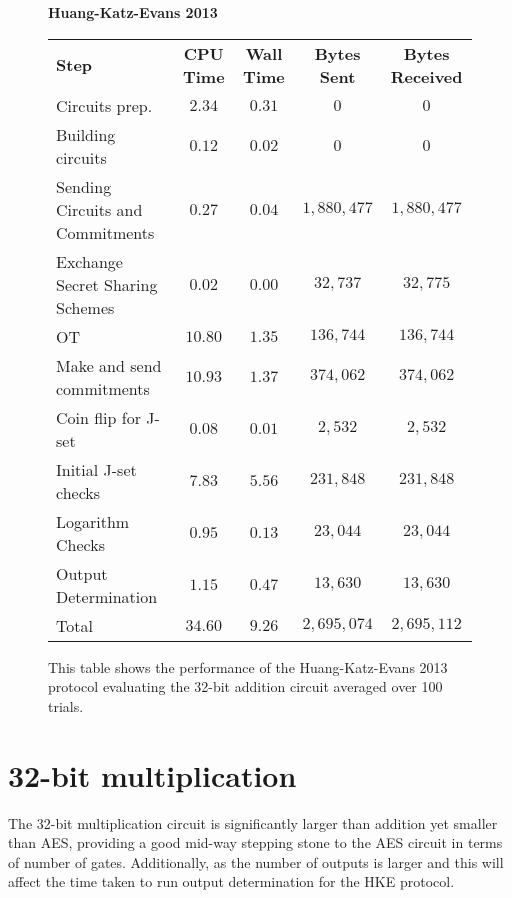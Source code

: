 \documentclass[ %
                    author={Nicholas Tutte},
                supervisor={Prof. Nigel Smart},
                    degree={MEng},
                     title={Secure Two Party Computation},
                  subtitle={A practical comparison of recent protocols},
                      type={Research - GG1K},
                      year={2015} ]{dissertation}
\begin{document}
				\begin{figure}[!ht]
						\textbf{Huang-Katz-Evans 2013}\\
						\begin{tabular}{| p{3.5cm} | c c c c |}
							\hline
							\textbf{Step} & \textbf{CPU Time} & \textbf{Wall Time} & \textbf{Bytes Sent} & \textbf{Bytes Received} \\
							\thickhline
							Circuits prep. & $2.34$ & $0.31$ & $0$ & $0$ \\
							\hline
							Building circuits & $0.12$ & $0.02$ & $0$ & $0$ \\
							\hline
							Sending Circuits and Commitments & $0.27$ & $0.04$ & $1,880,477$ & $1,880,477$ \\
							\hline
							Exchange Secret Sharing Schemes & $0.02$ & $0.00$ & $32,737$ & $32,775$ \\
							\hline
							OT & $10.80$ & $1.35$ & $136,744$ & $136,744$ \\
							\hline
							Make and send commitments & $10.93$ & $1.37$ & $374,062$ & $374,062$ \\
							\hline
							Coin flip for J-set & $0.08$ & $0.01$ & $2,532$ & $2,532$ \\
							\hline
							Initial J-set checks & $7.83$ & $5.56$ & $231,848$ & $231,848$ \\
							\hline
							Logarithm Checks & $0.95$ & $0.13$ & $23,044$ & $23,044$ \\
							\hline
							Output Determination & $1.15$ & $0.47$ & $13,630$ & $13,630$ \\
							\thickhline
							Total & $34.60$ & $9.26$ & $2,695,074$ & $2,695,112$ \\
							\hline
						\end{tabular}
					\caption{This table shows the performance of the Huang-Katz-Evans 2013 protocol evaluating the 32-bit addition circuit averaged over 100 trials.\label{table:HKE_2013_Add}}
				\end{figure}


			\section{32-bit multiplication}

				The 32-bit multiplication circuit is significantly larger than addition yet smaller than AES, providing a good mid-way stepping stone to the AES circuit in terms of number of gates. Additionally, as the number of outputs is larger and this will affect the time taken to run output determination for the HKE protocol.\\
\end{document}
